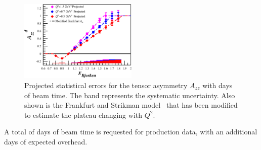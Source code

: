 \begin{figure}
\begin{center}
\includegraphics[width=0.5\textwidth]{figs/Pzz_30_Azz_combo.eps} 
\caption{\label{PROJ}Projected statistical errors for the tensor asymmetry $A_{zz}$ with \productiondays days of beam time. The band represents the systematic uncertainty. Also shown is the Frankfurt and Strikman model~\cite{Frankfurt:1988nt} that has been modified to estimate the plateau changing with $Q^2$.
}
\end{center}
\end{figure}

A total of \productiondays days of beam time is requested for production data, with an additional \overheaddays days of expected overhead.



\clearpage

%





